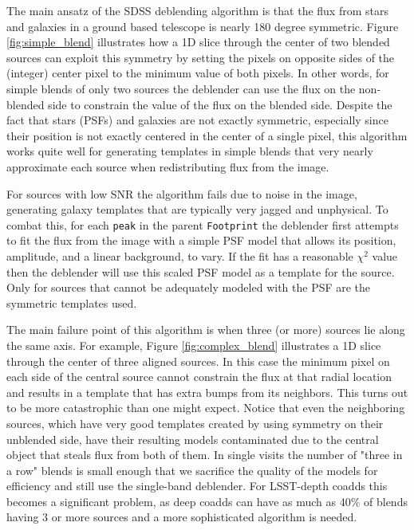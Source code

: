 The main ansatz of the SDSS deblending algorithm is that the flux from stars and galaxies in a ground based telescope is nearly 180 degree symmetric.
Figure \ref{fig:simple_blend} illustrates how a 1D slice through the center of two blended sources can exploit this symmetry by setting the pixels on opposite sides of the (integer) center pixel to the minimum value of both pixels.
In other words, for simple blends of only two sources the deblender can use the flux on the non-blended side to constrain the value of the flux on the blended side.
Despite the fact that stars (PSFs) and galaxies are not exactly symmetric, especially since their position is not exactly centered in the center of a single pixel, this algorithm works quite well for generating templates in simple blends that very nearly approximate each source when redistributing flux from the image.

For sources with low SNR the algorithm fails due to noise in the image, generating galaxy templates that are typically very jagged and unphysical.
To combat this, for each \texttt{peak} in the parent \texttt{Footprint} the deblender first attempts to fit the flux from the image with a simple PSF model that allows its position, amplitude, and a linear background, to vary.
If the fit has a reasonable $\chi^2$ value then the deblender will use this scaled PSF model as a template for the source.
Only for sources that cannot be adequately modeled with the PSF are the symmetric templates used.

The main failure point of this algorithm is when three (or more) sources lie along the same axis.
For example, Figure \ref{fig:complex_blend} illustrates a 1D slice through the center of three aligned sources.
In this case the minimum pixel on each side of the central source cannot constrain the flux at that radial location and results in a template that has extra bumps from its neighbors.
This turns out to be more catastrophic than one might expect.
Notice that even the neighboring sources, which have very good templates created by using symmetry on their unblended side, have their resulting models contaminated due to the central object that steals flux from both of them.
In single visits the number of "three in a row" blends is small enough that we sacrifice the quality of the models for efficiency and still use the single-band deblender.
For LSST-depth coadds this becomes a significant problem, as deep coadds can have as much as 40\% of blends having 3 or more sources and a more sophisticated algorithm is needed.

